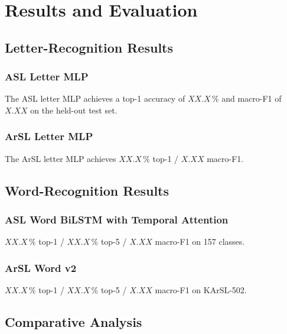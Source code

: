 \chapter{Results and Evaluation}
\label{ch:results}

\section{Letter-Recognition Results}
\label{sec:res:letter}


\subsection{ASL Letter MLP}
The ASL letter MLP achieves a top-1 accuracy of $XX.X\,\%$ and macro-F1
of $X.XX$ on the held-out test set.

\subsection{ArSL Letter MLP}
The ArSL letter MLP achieves $XX.X\,\%$ top-1 / $X.XX$ macro-F1.

\section{Word-Recognition Results}
\label{sec:res:word}

\subsection{ASL Word BiLSTM with Temporal Attention}
$XX.X\,\%$ top-1 / $XX.X\,\%$ top-5 / $X.XX$ macro-F1 on 157 classes.

\subsection{ArSL Word v2}
$XX.X\,\%$ top-1 / $XX.X\,\%$ top-5 / $X.XX$ macro-F1 on KArSL-502.

\section{Comparative Analysis}
\label{sec:res:compare}

